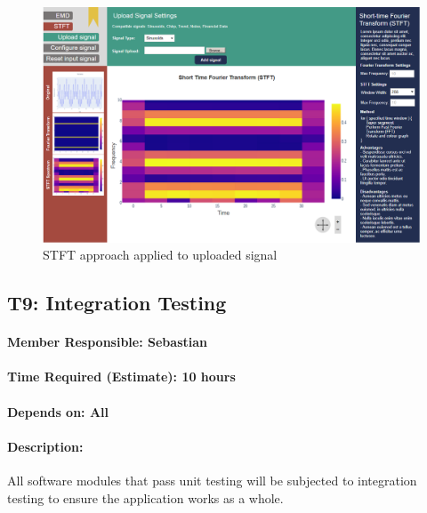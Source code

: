 \documentclass[
  paper=a4,
  ,captions=tableheading
]{scrartcl}
\begin{document}
\begin{figure}
\centering
\includegraphics{img/STFT_upload.PNG}
\caption{STFT approach applied to uploaded signal}
\end{figure}

\newpage
\hypertarget{t9-integration-testing}{%
\subsection{T9: Integration Testing}\label{t9-integration-testing}}

\hypertarget{member-responsible-sebastian}{%
\paragraph{Member Responsible:
Sebastian}\label{member-responsible-sebastian}}

\hypertarget{time-required-estimate-10-hours}{%
\paragraph{Time Required (Estimate): 10 hours}\label{time-required-estimate-10-hours}}

\hypertarget{depends-on-all}{%
\paragraph{Depends on: All}\label{depends-on-all}}

\hypertarget{description-7}{%
\paragraph{Description:}\label{description-7}}

All software modules that pass unit testing will be subjected to
integration testing to ensure the application works as a whole.
\end{document}
